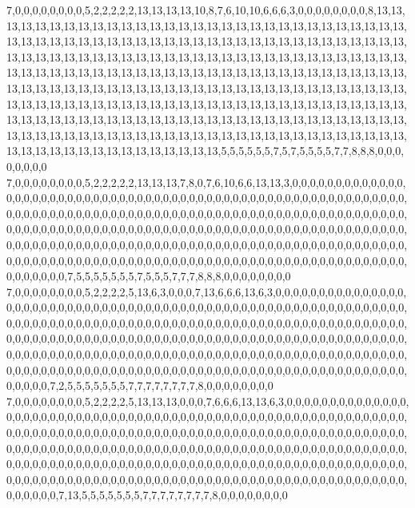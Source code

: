7,0,0,0,0,0,0,0,0,5,2,2,2,2,2,13,13,13,13,10,8,7,6,10,10,6,6,6,3,0,0,0,0,0,0,0,0,8,13,13,13,13,13,13,13,13,13,13,13,13,13,13,13,13,13,13,13,13,13,13,13,13,13,13,13,13,13,13,13,13,13,13,13,13,13,13,13,13,13,13,13,13,13,13,13,13,13,13,13,13,13,13,13,13,13,13,13,13,13,13,13,13,13,13,13,13,13,13,13,13,13,13,13,13,13,13,13,13,13,13,13,13,13,13,13,13,13,13,13,13,13,13,13,13,13,13,13,13,13,13,13,13,13,13,13,13,13,13,13,13,13,13,13,13,13,13,13,13,13,13,13,13,13,13,13,13,13,13,13,13,13,13,13,13,13,13,13,13,13,13,13,13,13,13,13,13,13,13,13,13,13,13,13,13,13,13,13,13,13,13,13,13,13,13,13,13,13,13,13,13,13,13,13,13,13,13,13,13,13,13,13,13,13,13,13,13,13,13,13,13,13,13,13,13,13,13,13,13,13,13,13,13,13,13,13,13,13,13,13,13,13,13,13,13,13,13,13,13,13,13,13,13,13,13,13,13,13,13,13,13,13,13,13,13,13,13,13,13,13,5,5,5,5,5,5,7,5,7,5,5,5,5,7,7,8,8,8,0,0,0,0,0,0,0,0
7,0,0,0,0,0,0,0,0,5,2,2,2,2,2,13,13,13,7,8,0,7,6,10,6,6,13,13,3,0,0,0,0,0,0,0,0,0,0,0,0,0,0,0,0,0,0,0,0,0,0,0,0,0,0,0,0,0,0,0,0,0,0,0,0,0,0,0,0,0,0,0,0,0,0,0,0,0,0,0,0,0,0,0,0,0,0,0,0,0,0,0,0,0,0,0,0,0,0,0,0,0,0,0,0,0,0,0,0,0,0,0,0,0,0,0,0,0,0,0,0,0,0,0,0,0,0,0,0,0,0,0,0,0,0,0,0,0,0,0,0,0,0,0,0,0,0,0,0,0,0,0,0,0,0,0,0,0,0,0,0,0,0,0,0,0,0,0,0,0,0,0,0,0,0,0,0,0,0,0,0,0,0,0,0,0,0,0,0,0,0,0,0,0,0,0,0,0,0,0,0,0,0,0,0,0,0,0,0,0,0,0,0,0,0,0,0,0,0,0,0,0,0,0,0,0,0,0,0,0,0,0,0,0,0,0,0,0,0,0,0,0,0,0,0,0,0,0,0,0,0,0,0,0,0,0,0,0,0,0,0,0,0,0,0,0,0,0,0,0,0,0,0,0,0,0,0,0,0,7,5,5,5,5,5,5,5,7,5,5,5,7,7,7,8,8,8,0,0,0,0,0,0,0,0
7,0,0,0,0,0,0,0,0,5,2,2,2,2,5,13,6,3,0,0,0,7,13,6,6,6,13,6,3,0,0,0,0,0,0,0,0,0,0,0,0,0,0,0,0,0,0,0,0,0,0,0,0,0,0,0,0,0,0,0,0,0,0,0,0,0,0,0,0,0,0,0,0,0,0,0,0,0,0,0,0,0,0,0,0,0,0,0,0,0,0,0,0,0,0,0,0,0,0,0,0,0,0,0,0,0,0,0,0,0,0,0,0,0,0,0,0,0,0,0,0,0,0,0,0,0,0,0,0,0,0,0,0,0,0,0,0,0,0,0,0,0,0,0,0,0,0,0,0,0,0,0,0,0,0,0,0,0,0,0,0,0,0,0,0,0,0,0,0,0,0,0,0,0,0,0,0,0,0,0,0,0,0,0,0,0,0,0,0,0,0,0,0,0,0,0,0,0,0,0,0,0,0,0,0,0,0,0,0,0,0,0,0,0,0,0,0,0,0,0,0,0,0,0,0,0,0,0,0,0,0,0,0,0,0,0,0,0,0,0,0,0,0,0,0,0,0,0,0,0,0,0,0,0,0,0,0,0,0,0,0,0,0,0,0,0,0,0,0,0,0,0,0,0,0,0,0,0,0,7,2,5,5,5,5,5,5,5,7,7,7,7,7,7,7,7,8,0,0,0,0,0,0,0,0
7,0,0,0,0,0,0,0,0,5,2,2,2,2,5,13,13,13,0,0,0,7,6,6,6,13,13,6,3,0,0,0,0,0,0,0,0,0,0,0,0,0,0,0,0,0,0,0,0,0,0,0,0,0,0,0,0,0,0,0,0,0,0,0,0,0,0,0,0,0,0,0,0,0,0,0,0,0,0,0,0,0,0,0,0,0,0,0,0,0,0,0,0,0,0,0,0,0,0,0,0,0,0,0,0,0,0,0,0,0,0,0,0,0,0,0,0,0,0,0,0,0,0,0,0,0,0,0,0,0,0,0,0,0,0,0,0,0,0,0,0,0,0,0,0,0,0,0,0,0,0,0,0,0,0,0,0,0,0,0,0,0,0,0,0,0,0,0,0,0,0,0,0,0,0,0,0,0,0,0,0,0,0,0,0,0,0,0,0,0,0,0,0,0,0,0,0,0,0,0,0,0,0,0,0,0,0,0,0,0,0,0,0,0,0,0,0,0,0,0,0,0,0,0,0,0,0,0,0,0,0,0,0,0,0,0,0,0,0,0,0,0,0,0,0,0,0,0,0,0,0,0,0,0,0,0,0,0,0,0,0,0,0,0,0,0,0,0,0,0,0,0,0,0,0,0,0,0,0,7,13,5,5,5,5,5,5,5,7,7,7,7,7,7,7,7,8,0,0,0,0,0,0,0,0
